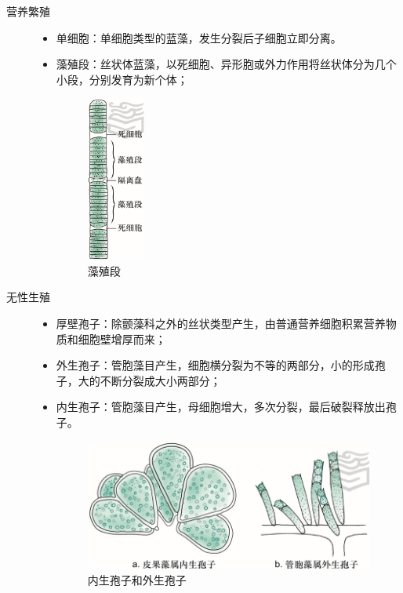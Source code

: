 \begin{description}
	\item[营养繁殖] 
	
	\begin{itemize}
		\item 单细胞：单细胞类型的蓝藻，发生分裂后子细胞立即分离。
		\item 藻殖段：丝状体蓝藻，以死细胞、异形胞或外力作用将丝状体分为几个小段，分别发育为新个体；
		\begin{figure}[htbp]
			\centering
			\includegraphics[width=0.2\textwidth]{Pics/藻殖段}
			\caption{藻殖段}
			\label{fig:zaozhiduan}
		\end{figure}
	\end{itemize}
	\item[无性生殖] 
	
	\begin{itemize}
		\item 厚壁孢子：除颤藻科之外的丝状类型产生，由普通营养细胞积累营养物质和细胞壁增厚而来；
		\item 外生孢子：管胞藻目产生，细胞横分裂为不等的两部分，小的形成孢子，大的不断分裂成大小两部分；
		\item 内生孢子：管胞藻目产生，母细胞增大，多次分裂，最后破裂释放出孢子。
		\begin{figure}[htbp]
			\centering
			\includegraphics[width=0.7\linewidth]{Pics/内生孢子和外生孢子}
			\caption{内生孢子和外生孢子}
			\label{fig:exospore_endospore}
		\end{figure}
		
	\end{itemize}
\end{description}


